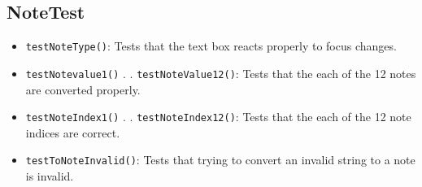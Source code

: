 \documentclass[11pt]{article}
\begin{document}
\subsection{NoteTest}
\label{sec:orgb7fa107}
\begin{itemize}
\item \texttt{testNoteType()}: Tests that the text box reacts properly to focus changes.
\item \texttt{testNotevalue1()} 
     .
     .
\texttt{testNoteValue12()}: Tests that the each of the 12 notes are converted properly.
\item \texttt{testNoteIndex1()} 
     .
     .
\texttt{testNoteIndex12()}: Tests that the each of the 12 note indices are correct.
\item \texttt{testToNoteInvalid()}: Tests that trying to convert an invalid string to a note is invalid.
\end{itemize}
\end{document}
